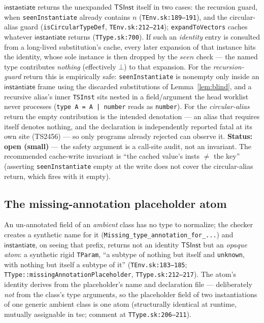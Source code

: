 \documentclass[11pt]{article}
\newcommand{\instop}{\mathsf{instantiate}}
\begin{document}
\begin{obligation}
\label{obl:guard}
$\instop$ returns the unexpanded $\mathsf{TSInst}$ itself in two cases:
the recursion guard, when \texttt{seenInstantiate} already contains $n$
(\texttt{TEnv.sk:189--191}), and the circular-alias guard
(\texttt{isCircularTypeDef}, \texttt{TEnv.sk:212--214});
\texttt{expandToVectors} caches whatever $\instop$ returns
(\texttt{TType.sk:700}). If such an \emph{identity} entry is consulted
from a long-lived substitution's cache, every later expansion of that
instance hits the identity, whose sole instance is then dropped by the
$\mathit{seen}$ check — the named type contributes \emph{nothing}
(effectively $\bot$) to that expansion. For the \emph{recursion-guard}
return this is empirically safe: \texttt{seenInstantiate} is nonempty
only inside an $\instop$ frame using the discarded substitutions of
Lemma~\ref{lem:blind}, and a recursive alias's inner \texttt{TSInst}
sits nested in a field/argument the head worklist never processes
(\texttt{type A = A | number} reads as \texttt{number}). For the
\emph{circular-alias} return the empty contribution is the intended
denotation — an alias that requires itself denotes nothing, and the
declaration is independently reported fatal at its own site (TS2456) —
so only programs already rejected can observe it. \textbf{Status: open
(small)} — the safety argument is a call-site audit, not an invariant.
The recommended cache-write invariant is ``the cached value's insts
$\neq$ the key'' (asserting \texttt{seenInstantiate} empty at the write
does not cover the circular-alias return, which fires with it empty).
\end{obligation}

\subsection{The missing-annotation placeholder atom}
\label{sec:placeholder}

An un-annotated field of an \emph{ambient} class has no type to
normalize; the checker creates a synthetic name for it
(\texttt{Missing\_type\_annotation\_for\_...}) and $\instop$, on seeing
that prefix, returns not an identity $\mathsf{TSInst}$ but an
\emph{opaque atom}: a synthetic rigid \texttt{TParam}, ``a subtype of
nothing but itself and \texttt{unknown}, with nothing but itself a
subtype of it'' (\texttt{TEnv.sk:183--185};
\texttt{TType::missingAnnotationPlaceholder}, \texttt{TType.sk:212--217}).
The atom's identity derives from the placeholder's name and declaration
file — deliberately \emph{not} from the class's type arguments, so the
placeholder field of two instantiations of one generic ambient class is
one atom (structurally identical at runtime, mutually assignable in
tsc; comment at \texttt{TType.sk:206--211}).
\end{document}
